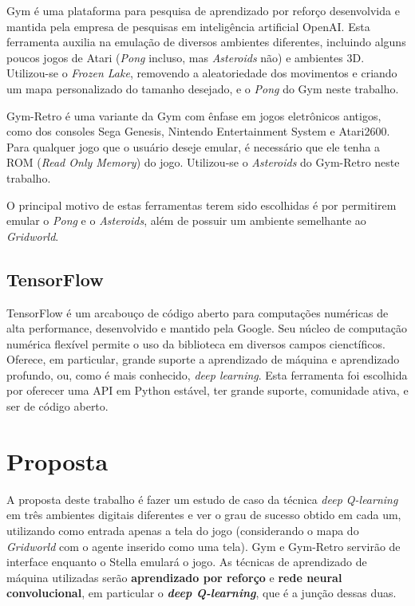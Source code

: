 Gym é uma plataforma para pesquisa de aprendizado por reforço desenvolvida e mantida pela empresa de pesquisas em inteligência artificial OpenAI.
Esta ferramenta auxilia na emulação de diversos ambientes diferentes, incluindo alguns poucos jogos de Atari (\textit{Pong} incluso, mas \textit{Asteroids} não) e ambientes 3D.
Utilizou-se o \textit{Frozen Lake}, removendo a aleatoriedade dos movimentos e criando um mapa personalizado do tamanho desejado, e o \textit{Pong} do Gym neste trabalho.

Gym-Retro é uma variante da Gym com ênfase em jogos eletrônicos antigos, como dos consoles Sega Genesis, Nintendo Entertainment System e Atari2600.
Para qualquer jogo que o usuário deseje emular, é necessário que ele tenha a ROM (\textit{Read Only Memory}) do jogo.
Utilizou-se o \textit{Asteroids} do Gym-Retro neste trabalho.

O principal motivo de estas ferramentas terem sido escolhidas é por permitirem emular o \textit{Pong} e o \textit{Asteroids}, além de possuir um ambiente semelhante ao \textit{Gridworld}.
\subsection{TensorFlow}
\label{sec:tensorflow}

TensorFlow é um arcabouço de código aberto para computações numéricas de alta performance, desenvolvido e mantido pela Google.
Seu núcleo de computação numérica flexível permite o uso da biblioteca em diversos campos cienctíficos.
Oferece, em particular, grande suporte a aprendizado de máquina e aprendizado profundo, ou, como é mais conhecido, \textit{deep learning}.
Esta ferramenta foi escolhida por oferecer uma API em Python estável, ter grande suporte, comunidade ativa, e ser de código aberto.


\section{Proposta}
\label{sec:proposta}

A proposta deste trabalho é fazer um estudo de caso da técnica \textit{deep Q-learning} em três ambientes digitais diferentes e ver o grau de sucesso obtido em cada um, utilizando como entrada apenas a tela do jogo (considerando o mapa do \textit{Gridworld} com o agente inserido como uma tela).
Gym e Gym-Retro servirão de interface enquanto o Stella emulará o jogo.
As técnicas de aprendizado de máquina utilizadas serão \textbf{aprendizado por reforço} e \textbf{rede neural convolucional}, em particular o \textbf{\textit{deep Q-learning}}, que é a junção dessas duas.

